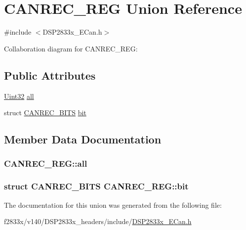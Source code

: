 \hypertarget{union_c_a_n_r_e_c___r_e_g}{}\section{C\+A\+N\+R\+E\+C\+\_\+\+R\+E\+G Union Reference}
\label{union_c_a_n_r_e_c___r_e_g}


{\ttfamily \#include $<$D\+S\+P2833x\+\_\+\+E\+Can.\+h$>$}



Collaboration diagram for C\+A\+N\+R\+E\+C\+\_\+\+R\+E\+G\+:
\subsection*{Public Attributes}
\begin{DoxyCompactItemize}
\item 
\hyperlink{_d_s_p2833x___device_8h_aba99025e657f892beb7ff31cecf64653}{Uint32} \hyperlink{union_c_a_n_r_e_c___r_e_g_acc84c5c12e76a556b206e92bfd6ffa68}{all}
\item 
struct \hyperlink{struct_c_a_n_r_e_c___b_i_t_s}{C\+A\+N\+R\+E\+C\+\_\+\+B\+I\+T\+S} \hyperlink{union_c_a_n_r_e_c___r_e_g_a4261c006362d9ae655ecffba079a0c48}{bit}
\end{DoxyCompactItemize}


\subsection{Member Data Documentation}
\hypertarget{union_c_a_n_r_e_c___r_e_g_acc84c5c12e76a556b206e92bfd6ffa68}{}
\subsubsection[{all}]{ C\+A\+N\+R\+E\+C\+\_\+\+R\+E\+G\+::all}\label{union_c_a_n_r_e_c___r_e_g_acc84c5c12e76a556b206e92bfd6ffa68}
\hypertarget{union_c_a_n_r_e_c___r_e_g_a4261c006362d9ae655ecffba079a0c48}{}
\subsubsection[{bit}]{\setlength{\rightskip}{0pt plus 5cm}struct {\bf C\+A\+N\+R\+E\+C\+\_\+\+B\+I\+T\+S} C\+A\+N\+R\+E\+C\+\_\+\+R\+E\+G\+::bit}\label{union_c_a_n_r_e_c___r_e_g_a4261c006362d9ae655ecffba079a0c48}


The documentation for this union was generated from the following file\+:\begin{DoxyCompactItemize}
\item 
f2833x/v140/\+D\+S\+P2833x\+\_\+headers/include/\hyperlink{_d_s_p2833x___e_can_8h}{D\+S\+P2833x\+\_\+\+E\+Can.\+h}\end{DoxyCompactItemize}
